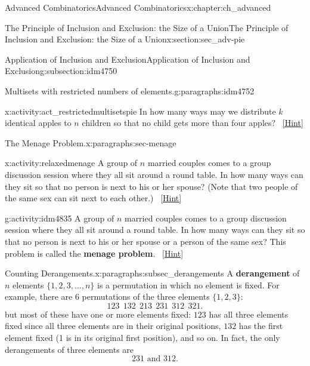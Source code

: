 \documentclass[oneside,10pt,]{book}
\newcommand{\terminology}[1]{\textbf{#1}}
\numberwithin{equation}{chapter}
\begin{document}
\begin{chapterptx}{Advanced Combinatorics}{}{Advanced Combinatorics}{}{}{x:chapter:ch_advanced}
\begin{sectionptx}{The Principle of Inclusion and Exclusion: the Size of a Union}{}{The Principle of Inclusion and Exclusion: the Size of a Union}{}{}{x:section:sec_adv-pie}
\begin{subsectionptx}{Application of Inclusion and Exclusion}{}{Application of Inclusion and Exclusion}{}{}{g:subsection:idm4750}
\begin{paragraphs}{Multisets with restricted numbers of elements.}{g:paragraphs:idm4752}%
\begin{activity}{}{x:activity:act_restrictedmultisetspie}%
In how many ways may we distribute \(k\) identical apples to \(n\) children so that no child gets more than four apples?%
\qquad~\hfill{\tiny\hyperlink{g:hint:idm4759-back}{[Hint]}}\end{activity}
\end{paragraphs}%
\begin{paragraphs}{The Menage Problem.}{x:paragraphs:sec-menage}%
\begin{activity}{}{x:activity:relaxedmenage}%
A group of \(n\) married couples comes to a group discussion session where they all sit around a round table. In how many ways can they sit so that no person is next to his or her spouse? (Note that two people of the same sex can sit next to each other.)%
\qquad~\hfill{\tiny\hyperlink{g:hint:idm4803-back}{[Hint]}}\end{activity}
\begin{activity}{}{g:activity:idm4835}%
A group of \(n\) married couples comes to a group discussion session where they all sit around a round table. In how many ways can they sit so that no person is next to his or her spouse or a person of the same sex? This problem is called the \terminology{menage problem}.%
\qquad~\hfill{\tiny\hyperlink{g:hint:idm4842-back}{[Hint]}}\end{activity}
\end{paragraphs}%
\begin{paragraphs}{Counting Derangements.}{x:paragraphs:subsec_derangements}%
A \terminology{derangement} of \(n\) elements \(\{1,2,3,\ldots, n\}\) is a permutation in which no element is fixed. For example, there are \(6\) permutations of the three elements \(\{1,2,3\}\):%
\begin{equation*}
123 ~~ 132 ~~ 213 ~~ 231 ~~ 312 ~~ 321.
\end{equation*}
but most of these have one or more elements fixed: \(123\) has all three elements fixed since all three elements are in their original positions, \(132\) has the first element fixed (1 is in its original first position), and so on. In fact, the only derangements of three elements are%
\begin{equation*}
231 \text{ and } 312.
\end{equation*}
%
\par

\end{paragraphs}
\end{subsectionptx}
\end{sectionptx}
\end{chapterptx}
\end{document}
